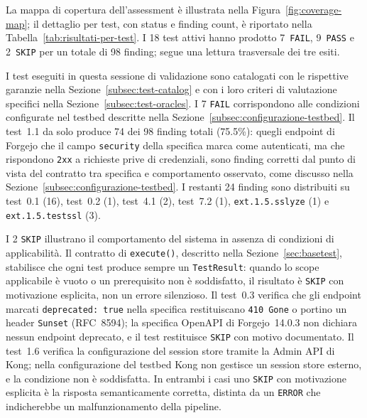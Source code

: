 La mappa di copertura dell'assessment è illustrata nella Figura~\ref{fig:coverage-map}; il dettaglio per test, con status e finding count, è riportato nella Tabella~\ref{tab:risultati-per-test}. I 18 test attivi hanno prodotto 7~\texttt{FAIL}, 9~\texttt{PASS} e 2~\texttt{SKIP} per un totale di 98 finding; segue una lettura trasversale dei tre esiti.





I test eseguiti in questa sessione di validazione sono catalogati con le rispettive garanzie nella Sezione~\ref{subsec:test-catalog} e con i loro criteri di valutazione specifici nella Sezione~\ref{subsec:test-oracles}.
I 7 \texttt{FAIL} corrispondono alle condizioni configurate nel testbed descritte nella Sezione~\ref{subsec:configurazione-testbed}. Il test~1.1 da solo produce 74 dei 98 finding totali (75.5\%): quegli endpoint di Forgejo che il campo \texttt{security} della specifica marca come autenticati, ma che rispondono \texttt{2xx} a richieste prive di credenziali, sono finding corretti dal punto di vista del contratto tra specifica e comportamento osservato, come discusso nella Sezione~\ref{subsec:configurazione-testbed}. I restanti 24 finding sono distribuiti su test~0.1 (16), test~0.2 (1), test~4.1 (2), test~7.2 (1), \texttt{ext.1.5.sslyze} (1) e \texttt{ext.1.5.testssl} (3).

I 2 \texttt{SKIP} illustrano il comportamento del sistema in assenza di condizioni di applicabilità. Il contratto di \texttt{execute()}, descritto nella Sezione~\ref{sec:basetest}, stabilisce che ogni test produce sempre un \texttt{TestResult}: quando lo scope applicabile è vuoto o un prerequisito non è soddisfatto, il risultato è \texttt{SKIP} con motivazione esplicita, non un errore silenzioso. Il test~0.3 verifica che gli endpoint marcati \texttt{deprecated:~true} nella specifica restituiscano \texttt{410~Gone} o portino un header \texttt{Sunset} (RFC~8594); la specifica OpenAPI di Forgejo~14.0.3 non dichiara nessun endpoint deprecato, e il test restituisce \texttt{SKIP} con motivo documentato. Il test~1.6 verifica la configurazione del session store tramite la Admin \gls{API} di Kong; nella configurazione del testbed Kong non gestisce un session store esterno, e la condizione non è soddisfatta. In entrambi i casi uno \texttt{SKIP} con motivazione esplicita è la risposta semanticamente corretta, distinta da un \texttt{ERROR} che indicherebbe un malfunzionamento della pipeline.

